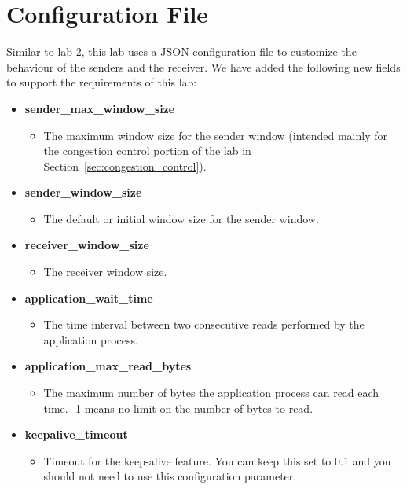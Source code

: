 \documentclass[11pt]{article}
\begin{document}
\section{Configuration File}
Similar to lab 2, this lab uses a JSON configuration file to customize the behaviour of the senders and the receiver. We have added the following new fields to support the requirements of this lab:

\begin{itemize}
    \item \textbf{sender\_max\_window\_size}
    \begin{itemize}
        \item The maximum window size for the sender window (intended mainly for the congestion control portion of the lab in Section~\ref{sec:congestion_control}).
    \end{itemize}

    \item \textbf{sender\_window\_size}
    \begin{itemize}
        \item The default or initial window size for the sender window.
    \end{itemize}

    \item \textbf{receiver\_window\_size}
    \begin{itemize}
        \item The receiver window size.
    \end{itemize}

    \item \textbf{application\_wait\_time}
    \begin{itemize}
        \item The time interval between two consecutive reads performed by the application process.
    \end{itemize}

    \item \textbf{application\_max\_read\_bytes}
    \begin{itemize}
        \item The maximum number of bytes the application process can read each time. -1 means no limit on the number of bytes to read.
    \end{itemize}

    \item \textbf{keepalive\_timeout}
    \begin{itemize}
        \item Timeout for the keep-alive feature. You can keep this set to 0.1 and you should not need to use this configuration parameter.
    \end{itemize}


\end{itemize}
\end{document}
